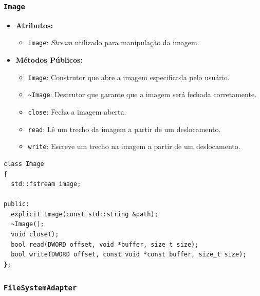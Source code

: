 \documentclass[
    12pt,				%
    oneside,   	        %
    a4paper,			%
    english,			%
    french,				%
    spanish,			%
    brazil,				%
    ]{pacotes/abntex2}
\begin{document}
\subsubsection{\texttt{Image}}
\label{subsubsec:image}

\begin{itemize}
    \item \textbf{Atributos:}
        \begin{itemize}
            \item \texttt{image}: \textit{Stream} utilizado para manipulação da imagem.
        \end{itemize}
    \item \textbf{Métodos Públicos:}
        \begin{itemize}
            \item \texttt{Image}: Construtor que abre a imagem especificada pelo usuário.
            
            \item \texttt{\textasciitilde Image}: Destrutor que garante que a imagem será fechada corretamente.
            
            \item \texttt{close}: Fecha a imagem aberta.
            
            \item \texttt{read}: Lê um trecho da imagem a partir de um deslocamento.
            
            \item \texttt{write}: Escreve um trecho na imagem a partir de um deslocamento.
        \end{itemize}
\end{itemize}

\begin{lstlisting}[caption={Classe para interação do arquivo \texttt{.img} que contém o FAT32 gravado}, label={lst:image}]
class Image
{
  std::fstream image;

public:
  explicit Image(const std::string &path);
  ~Image();
  void close();
  bool read(DWORD offset, void *buffer, size_t size);
  bool write(DWORD offset, const void *const buffer, size_t size);
};
\end{lstlisting}

\subsubsection{\texttt{FileSystemAdapter}}
\label{subsubsec:file_system_adapter}
\end{document}
